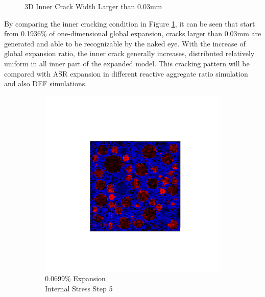\begin{figure}[!h]
  \caption{3D Inner Crack Width Larger than 0.03mm}
  \label{fig:ASR_A30P75_crack}
\end{figure}

By comparing the inner cracking condition in Figure \ref{fig:ASR_A30P75_crack}, it can be seen that start from 0.1936\% of one-dimensional global expansion, cracks larger than 0.03mm are generated and able to be recognizable by the naked eye. With the increase of global expansion ratio, the inner crack generally increases, distributed relatively uniform in all inner part of the expanded model. This cracking pattern will be compared with ASR expansion in different reactive aggregate ratio simulation and also DEF simulations.

\begin{figure}[h!]
\centering
    \begin{subfigure}{.25\textwidth}
      \centering
      \includegraphics[width=1.0\linewidth]{Files/exp_3D/ASR/A30P75_1_s5.png}
      \caption{0.0699\% Expansion\\Internal Stress Step 5}
    \end{subfigure}%
    \begin{subfigure}{.25\textwidth}
      \centering

\end{subfigure}
\end{figure}
